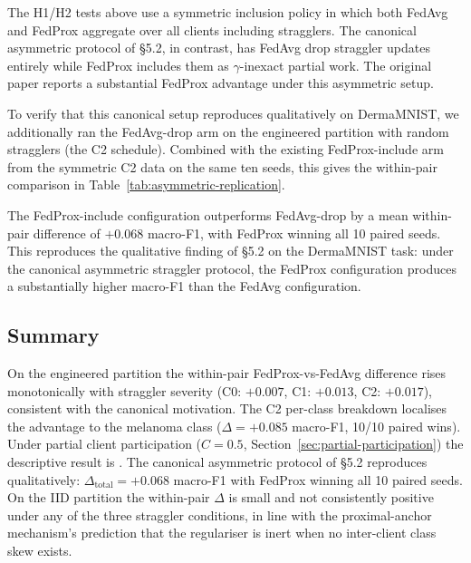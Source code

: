 The H1/H2 tests above use a symmetric inclusion policy in which both
FedAvg and FedProx aggregate over all clients including stragglers.
The canonical asymmetric protocol of \citet{li2020fedprox} §5.2, in
contrast, has FedAvg drop straggler updates entirely while FedProx
includes them as $\gamma$-inexact partial work. The original paper
reports a substantial FedProx advantage under this asymmetric setup.

To verify that this canonical setup reproduces qualitatively on
DermaMNIST, we additionally ran the FedAvg-drop arm on the engineered
partition with random stragglers (the C2 schedule). Combined with the
existing FedProx-include arm from the symmetric C2 data on the same
ten seeds, this gives the within-pair comparison in
Table~\ref{tab:asymmetric-replication}.



The FedProx-include configuration outperforms FedAvg-drop by a mean
within-pair difference of $+0.068$ macro-F1, with FedProx winning
all 10 paired seeds. This reproduces the qualitative finding of
\citet{li2020fedprox} §5.2 on the DermaMNIST task: under the
canonical asymmetric straggler protocol, the FedProx configuration
produces a substantially higher macro-F1 than the FedAvg
configuration.

\subsection{Summary}
\label{sec:system-het-summary}

On the engineered partition the within-pair FedProx-vs-FedAvg
difference rises monotonically with straggler severity (C0:
$+0.007$, C1: $+0.013$, C2: $+0.017$), consistent with the canonical
\citet{li2020fedprox} motivation. The C2 per-class breakdown localises
the advantage to the melanoma class ($\Delta = +0.085$ macro-F1, 10/10
paired wins). Under partial client participation ($C = 0.5$,
Section~\ref{sec:partial-participation}) the descriptive result is
. The canonical asymmetric
protocol of \citet{li2020fedprox} §5.2 reproduces qualitatively:
$\Delta_{\text{total}} = +0.068$ macro-F1 with FedProx winning all 10
paired seeds. On the IID partition the within-pair $\Delta$ is small
and not consistently positive under any of the three straggler
conditions, in line with the proximal-anchor mechanism's prediction
that the regulariser is inert when no inter-client class skew exists.

